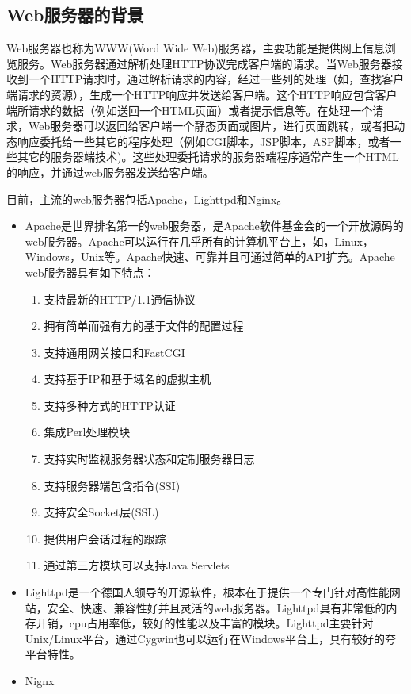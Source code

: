 \documentclass[18pt, twoside, a4paper, dvipdfm]{book}
\begin{document}
\subsection{Web服务器的背景}
	Web服务器也称为WWW(Word Wide Web)服务器，主要功能是提供网上信息浏览服务。Web服务器通过解析处理HTTP协议完成客户端的请求。当Web服务器接收到一个HTTP请求时，通过解析请求的内容，经过一些列的处理（如，查找客户端请求的资源），生成一个HTTP响应并发送给客户端。这个HTTP响应包含客户端所请求的数据（例如送回一个HTML页面）或者提示信息等。在处理一个请求，Web服务器可以返回给客户端一个静态页面或图片，进行页面跳转，或者把动态响应委托给一些其它的程序处理（例如CGI脚本，JSP脚本，ASP脚本，或者一些其它的服务器端技术)。这些处理委托请求的服务器端程序通常产生一个HTML的响应，并通过web服务器发送给客户端。
	
	目前，主流的web服务器包括Apache，Lighttpd和Nginx。
	\begin{itemize}
		\item Apache是世界排名第一的web服务器，是Apache软件基金会的一个开放源码的web服务器。Apache可以运行在几乎所有的计算机平台上，如，Linux，Windows，Unix等。Apache快速、可靠并且可通过简单的API扩充。Apache web服务器具有如下特点：
		\begin{enumerate}
			\item 支持最新的HTTP/1.1通信协议
　　			\item 拥有简单而强有力的基于文件的配置过程
　　			\item 支持通用网关接口和FastCGI
　　			\item 支持基于IP和基于域名的虚拟主机
　　			\item 支持多种方式的HTTP认证
　　			\item 集成Perl处理模块
　　			\item 支持实时监视服务器状态和定制服务器日志
　　			\item 支持服务器端包含指令(SSI)
　　			\item 支持安全Socket层(SSL)
　　			\item 提供用户会话过程的跟踪
　　			\item 通过第三方模块可以支持Java Servlets
		\end{enumerate}
		\item Lighttpd是一个德国人领导的开源软件，根本在于提供一个专门针对高性能网站，安全、快速、兼容性好并且灵活的web服务器。Lighttpd具有非常低的内存开销，cpu占用率低，较好的性能以及丰富的模块。Lighttpd主要针对Unix/Linux平台，通过Cygwin也可以运行在Windows平台上，具有较好的夸平台特性。
		\item Nignx
	\end{itemize}
\end{document}
